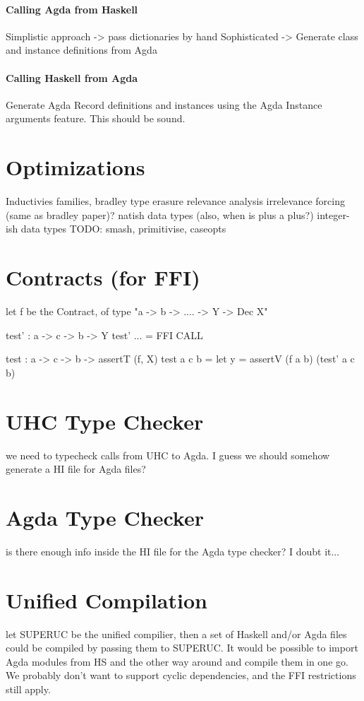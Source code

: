 \documentclass[12pt, a4paper, twoside]{report}
\begin{document}
\paragraph{Calling Agda from Haskell}
Simplistic approach -> pass dictionaries by hand
Sophisticated -> Generate class and instance definitions from Agda

\paragraph{Calling Haskell from Agda}
Generate Agda Record definitions and instances using the Agda Instance arguments feature.
This should be sound.

\section{Optimizations}
Inductivies families, bradley
type erasure
relevance analysis
irrelevance
forcing (same as bradley paper)?
natish data types (also, when is plus a plus?)
integer-ish data types
TODO: smash, primitivise, caseopts

\section{Contracts (for FFI)}

let f be the Contract, of type "a -> b -> .... -> Y -> Dec X"

test' : a -> c -> b -> Y
test' ... = FFI CALL

test : a -> c -> b -> assertT (f, X)
test a c b = let y = assertV (f a b) (test' a c b)

\section{UHC Type Checker}
we need to typecheck calls from UHC to Agda. I guess we should somehow generate a HI file for Agda files?

\section{Agda Type Checker}
is there enough info inside the HI file for the Agda type checker? I doubt it...

\section{Unified Compilation}
let SUPERUC be the unified compilier, then a set of Haskell and/or Agda files
could be compiled by passing them to SUPERUC. It would be possible to import
Agda modules from HS and the other way around and compile them in one go.
We probably don't want to support cyclic dependencies, and the FFI restrictions still apply.
\end{document}
